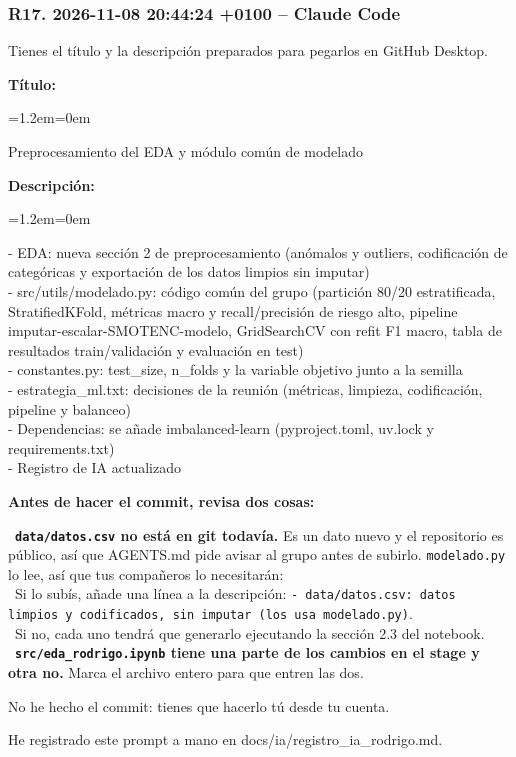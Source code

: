 \documentclass[11pt,a4paper]{article}
\newenvironment{codigo}
  {\par\smallskip\begin{list}{}{\leftmargin=1.2em\rightmargin=0em}\item\relax\ttfamily\scriptsize\raggedright}
  {\end{list}\smallskip}
\begin{document}
\subsubsection*{R17. 2026-11-08 20:44:24 +0100 -- Claude Code}
{\small
Tienes el título y la descripción preparados para pegarlos en GitHub Desktop.

\textbf{Título:}

\begin{codigo}
Preprocesamiento del EDA y módulo común de modelado
\end{codigo}
\textbf{Descripción:}

\begin{codigo}
- EDA: nueva sección 2 de preprocesamiento (anómalos y outliers, codificación de categóricas y exportación de los datos limpios sin imputar) \\{}
- src/\allowbreak{}utils/\allowbreak{}modelado.py: código común del grupo (partición 80/\allowbreak{}20 estratificada, StratifiedKFold, métricas macro y recall/\allowbreak{}precisión de riesgo alto, pipeline imputar-escalar-SMOTENC-modelo, GridSearchCV con refit F1 macro, tabla de resultados train/\allowbreak{}validación y evaluación en test) \\{}
- constantes.py: test\_\allowbreak{}size, n\_\allowbreak{}folds y la variable objetivo junto a la semilla \\{}
- estrategia\_\allowbreak{}ml.txt: decisiones de la reunión (métricas, limpieza, codificación, pipeline y balanceo) \\{}
- Dependencias: se añade imbalanced-learn (pyproject.toml, uv.lock y requirements.txt) \\{}
- Registro de IA actualizado
\end{codigo}
\textbf{Antes de hacer el commit, revisa dos cosas:}

\hspace*{1.0em}\textbullet~\textbf{\texttt{data/\allowbreak{}datos.csv} no está en git todavía.} Es un dato nuevo y el repositorio es público, así que AGENTS.md pide avisar al grupo antes de subirlo. \texttt{modelado.py} lo lee, así que tus compañeros lo necesitarán: \\{}
\hspace*{2.0em}\textbullet~Si lo subís, añade una línea a la descripción: \texttt{- data/\allowbreak{}datos.csv: datos limpios y codificados, sin imputar (los usa modelado.py)}. \\{}
\hspace*{2.0em}\textbullet~Si no, cada uno tendrá que generarlo ejecutando la sección 2.3 del notebook. \\{}
\hspace*{1.0em}\textbullet~\textbf{\texttt{src/\allowbreak{}eda\_\allowbreak{}rodrigo.ipynb} tiene una parte de los cambios en el stage y otra no.} Marca el archivo entero para que entren las dos.

No he hecho el commit: tienes que hacerlo tú desde tu cuenta.

He registrado este prompt a mano en docs/\allowbreak{}ia/\allowbreak{}registro\_\allowbreak{}ia\_\allowbreak{}rodrigo.md.

}
\end{document}

